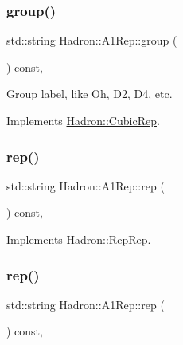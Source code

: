 \subsubsection{\texorpdfstring{group()}{group()}\hspace{0.1cm}{\footnotesize\ttfamily [2/2]}}
{\footnotesize\ttfamily std\+::string Hadron\+::\+A1\+Rep\+::group (\begin{DoxyParamCaption}{ }\end{DoxyParamCaption}) const\hspace{0.3cm}{\ttfamily [inline]}, {\ttfamily [virtual]}}

Group label, like Oh, D2, D4, etc. 

Implements \mbox{\hyperlink{structHadron_1_1CubicRep_a0748f11ec87f387062c8e8981339a29c}{Hadron\+::\+Cubic\+Rep}}.

\mbox{\label{structHadron_1_1A1Rep_a6b592d902063cfea9bd1cedcdeb9ac79}} 
\subsubsection{\texorpdfstring{rep()}{rep()}\hspace{0.1cm}{\footnotesize\ttfamily [1/3]}}
{\footnotesize\ttfamily std\+::string Hadron\+::\+A1\+Rep\+::rep (\begin{DoxyParamCaption}{ }\end{DoxyParamCaption}) const\hspace{0.3cm}{\ttfamily [inline]}, {\ttfamily [virtual]}}



Implements \mbox{\hyperlink{structHadron_1_1RepRep_ab3213025f6de249f7095892109575fde}{Hadron\+::\+Rep\+Rep}}.

\mbox{\label{structHadron_1_1A1Rep_a6b592d902063cfea9bd1cedcdeb9ac79}} 
\subsubsection{\texorpdfstring{rep()}{rep()}\hspace{0.1cm}{\footnotesize\ttfamily [2/3]}}
{\footnotesize\ttfamily std\+::string Hadron\+::\+A1\+Rep\+::rep (\begin{DoxyParamCaption}{ }\end{DoxyParamCaption}) const\hspace{0.3cm}{\ttfamily [inline]}, {\ttfamily [virtual]}}



